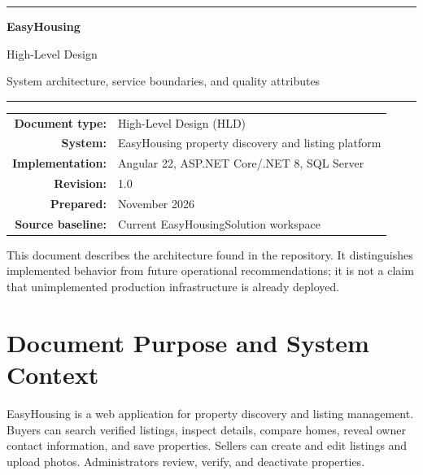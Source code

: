 \documentclass[11pt,a4paper]{article}
\newcommand{\tagline}[1]{{\large\color{ehgray}#1}}
\begin{document}
\begin{titlepage}
\centering
\vspace*{25mm}
{\color{ehgreen}\rule{\textwidth}{2pt}}\par
\vspace{14mm}
{\Huge\bfseries EasyHousing\par}
\vspace{5mm}
{\LARGE High-Level Design\par}
\vspace{6mm}
\tagline{System architecture, service boundaries, and quality attributes}\par
\vspace{15mm}
{\color{ehgreen}\rule{0.62\textwidth}{1pt}}\par
\vspace{19mm}
\begin{tabular}{rl}
\textbf{Document type:} & High-Level Design (HLD)\\
\textbf{System:} & EasyHousing property discovery and listing platform\\
\textbf{Implementation:} & Angular 22, ASP.NET Core/.NET 8, SQL Server\\
\textbf{Revision:} & 1.0\\
\textbf{Prepared:} & November 2026\\
\textbf{Source baseline:} & Current EasyHousingSolution workspace\\
\end{tabular}
\vfill
\begin{minipage}{0.82\textwidth}
\small\color{ehgray}
This document describes the architecture found in the repository. It distinguishes
implemented behavior from future operational recommendations; it is not a claim that
unimplemented production infrastructure is already deployed.
\end{minipage}
\vspace{12mm}
\end{titlepage}

\tableofcontents
\newpage

\section{Document Purpose and System Context}
EasyHousing is a web application for property discovery and listing management. Buyers
can search verified listings, inspect details, compare homes, reveal owner contact
information, and save properties. Sellers can create and edit listings and upload
photos. Administrators review, verify, and deactivate properties.
\end{document}

